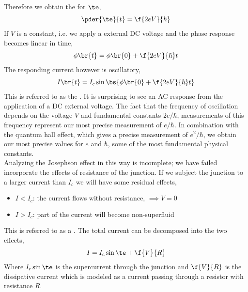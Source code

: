 \documentclass{article}
\begin{document}
Therefore we obtain the  for $\te$,
\[ \pder{\te}{t} = \f{2eV}{\hbar} \]
If $V$ is a constant, i.e. we apply a external DC voltage and the phase response becomes linear in time,
\[ \phi\br{t} = \phi\br{0} + \f{2eV}{\hbar}t \]
The responding current however is oscillatory,
\[ I\br{t} = I_c \sin \bs{\phi\br{0} + \f{2eV}{\hbar}t} \]
This is referred to as the . It is surprising to see an AC response from the application of a DC external voltage. The fact that the frequency of oscillation depends on the voltage $V$ and fundamental constants $2e/\hbar$, measurements of this frequency represent our most precise measurement of ${e}/{\hbar}$. In combination with the quantum hall effect, which gives a precise measurement of $e^2/\hbar$, we obtain our most precise values for $e$ and $\hbar$, some of the most fundamental physical constants.\\

Analyzing the Josephson effect in this way is incomplete; we have failed incorporate the effects of resistance of the junction. If we subject the junction to a larger current than $I_c$ we will have some residual effects,

\begin{itemize}
    \item $I < I_c$: the current flows without resistance, $\implies V = 0$
    \item $I > I_c$: part of the current will become non-superfluid
\end{itemize}
This is referred to as a . The total current can be decomposed into the two effects,
\[ I = I_c \sin \te + \f{V}{R} \]
Where $I_c\sin\te$ is the supercurrent through the junction and $\f{V}{R}$ is the dissipative current which is modeled as a current passing through a resistor with resistance $R$.\\
\end{document}
